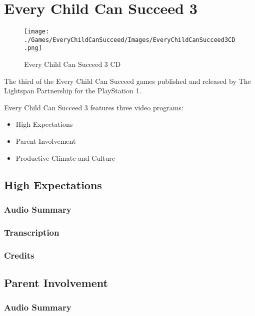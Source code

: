 \chapter{Every Child Can Succeed 3}

\begin{figure}[H]
    \centering
    \texttt{[image: ./Games/EveryChildCanSucceed/Images/EveryChildCanSucceed3CD.png]}
    \caption{Every Child Can Succeed 3 CD}
\end{figure}

The third of the Every Child Can Succeed games published and released by The Lightspan Partnership for the PlayStation 1.

Every Child Can Succeed 3 features three video programs:

\begin{itemize}
    \item High Expectations
    \item Parent Involvement
    \item Productive Climate and Culture
\end{itemize}

\clearpage
\newpage

\section{High Expectations}

\subsection{Audio Summary}

\subsection{Transcription}

\subsection{Credits}

\section{Parent Involvement}

\subsection{Audio Summary}

